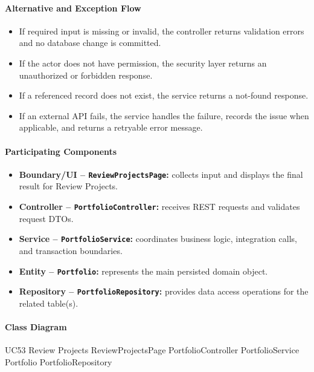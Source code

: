 \paragraph{Alternative and Exception Flow}

\begin{itemize}
    \item If required input is missing or invalid, the controller returns validation errors and no database change is committed.
    \item If the actor does not have permission, the security layer returns an unauthorized or forbidden response.
    \item If a referenced record does not exist, the service returns a not-found response.
    \item If an external API fails, the service handles the failure, records the issue when applicable, and returns a retryable error message.
\end{itemize}

\paragraph{Participating Components}

\begin{itemize}
    \item \textbf{Boundary/UI -- \texttt{ReviewProjectsPage}:} collects input and displays the final result for Review Projects.
    \item \textbf{Controller -- \texttt{PortfolioController}:} receives REST requests and validates request DTOs.
    \item \textbf{Service -- \texttt{PortfolioService}:} coordinates business logic, integration calls, and transaction boundaries.
    \item \textbf{Entity -- \texttt{Portfolio}:} represents the main persisted domain object.
    \item \textbf{Repository -- \texttt{PortfolioRepository}:} provides data access operations for the related table(s).
\end{itemize}

\paragraph{Class Diagram}

\ClassDiagram
{UC53 Review Projects}
{ReviewProjectsPage}
{PortfolioController}
{PortfolioService}
{Portfolio}
{PortfolioRepository}

